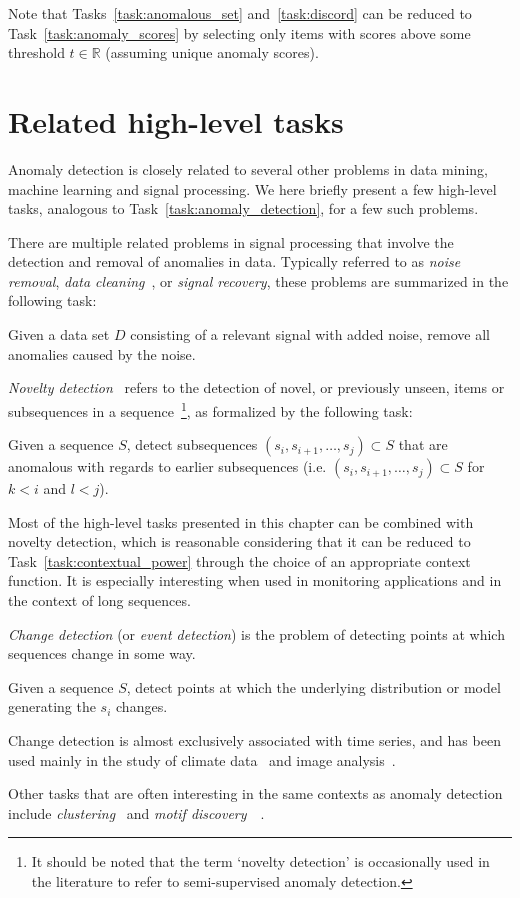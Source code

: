 Note that Tasks~\ref{task:anomalous_set} and~\ref{task:discord} can be reduced to Task~\ref{task:anomaly_scores} by selecting only items with scores above some threshold $t \in \mathbb{R}$ (assuming unique anomaly scores).

\section{Related high-level tasks}
\label{sect:related_tasks}

Anomaly detection is closely related to several other problems in data mining, machine learning and signal processing. We here briefly present a few high-level tasks, analogous to Task~\ref{task:anomaly_detection}, for a few such problems.

There are multiple related problems in signal processing that involve the detection and removal of anomalies in data. Typically referred to as \emph{noise removal}, \emph{data cleaning}~\cite{meckesheimer}, or \emph{signal recovery}, these problems are summarized in the following task:
\begin{task}
  Given a data set $D$ consisting of a relevant signal with added noise, remove all anomalies caused by the noise.
\end{task}

\emph{Novelty detection}~\cite{chandola} refers to the detection of novel, or previously unseen, items or subsequences in a sequence~\footnote{It should be noted that the term `novelty detection' is occasionally used in the literature to refer to semi-supervised anomaly detection.}, as formalized by the following task:
\begin{task}
\label{task:novelty_detection}
  Given a sequence $S$, detect subsequences $(s_i, s_{i+1}, \dots, s_j) \subset S$ that are anomalous with regards to earlier subsequences (i.e. $(s_i, s_{i+1}, \dots, s_j) \subset S$ for $k < i$ and $l < j$).
\end{task}
Most of the high-level tasks presented in this chapter can be combined with novelty detection, which is reasonable considering that it can be reduced to Task~\ref{task:contextual_power} through the choice of an appropriate context function. It is especially interesting when used in monitoring applications and in the context of long sequences.

\emph{Change detection} (or \emph{event detection}) is the problem of detecting points at which sequences change in some way.
\begin{task}
      Given a sequence $S$, detect points at which the underlying distribution or model generating the $s_i$ changes.
\end{task}
Change detection is almost exclusively associated with time series, and has been used mainly in the study of climate data~\cite{gopala} and image analysis~\cite{radke}.

Other tasks that are often interesting in the same contexts as anomaly detection include \emph{clustering}~\cite{clustering} and \emph{motif discovery}~\cite{motif}~\cite{motif2}.

